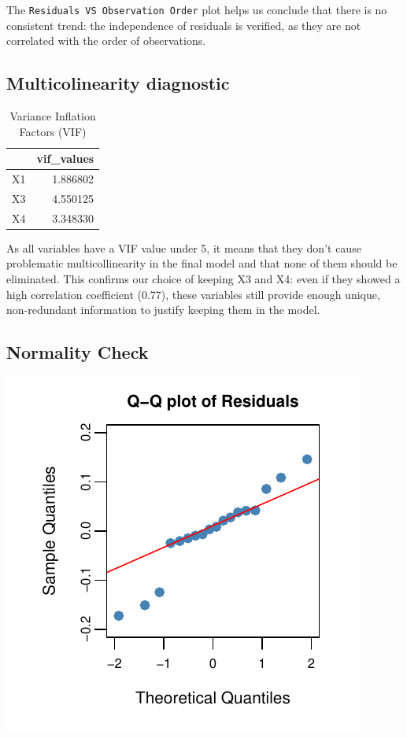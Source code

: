 \documentclass[
  11pt,
]{article}
\begin{document}
The \texttt{Residuals\ VS\ Observation\ Order} plot helps us conclude
that there is no consistent trend: the independence of residuals is
verified, as they are not correlated with the order of observations.

\subsection{Multicolinearity
diagnostic}\label{multicolinearity-diagnostic}

\begingroup\fontsize{8}{10}\selectfont

\begin{longtable}[t]{lr}
\caption{\label{tab:unnamed-chunk-20}Variance Inflation Factors (VIF)}\\
\toprule
 & vif\_values\\
\midrule
X1 & 1.886802\\
X3 & 4.550125\\
X4 & 3.348330\\
\bottomrule
\end{longtable}
\endgroup{}

As all variables have a VIF value under 5, it means that they don't
cause problematic multicollinearity in the final model and that none of
them should be eliminated. This confirms our choice of keeping X3 and
X4: even if they showed a high correlation coefficient (0.77), these
variables still provide enough unique, non-redundant information to
justify keeping them in the model.

\subsection{Normality Check}\label{normality-check}

\includegraphics{Figs/unnamed-chunk-21-1.pdf}
\end{document}
